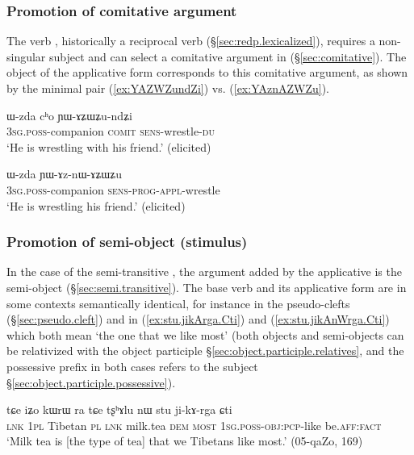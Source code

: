 \subsubsection{Promotion of comitative argument} \label{sec:applicative.comitative}
The verb , historically a reciprocal verb (§\ref{sec:redp.lexicalized}), requires a non-singular subject and can select a comitative argument in  (§\ref{sec:comitative}). The object of the applicative form  corresponds to this comitative argument, as shown by the minimal pair (\ref{ex:YAZWZundZi}) vs. (\ref{ex:YAznAZWZu}).

\begin{exe}
\ex \label{ex:YAZWZundZi}
\gll ɯ-zda cʰo ɲɯ-ɤʑɯʑu-ndʑi \\
\textsc{3sg}.\textsc{poss}-companion \textsc{comit} \textsc{sens}-wrestle-\textsc{du}  \\
\glt `He is wrestling with his friend.' (elicited)
\end{exe}

\begin{exe}
\ex \label{ex:YAznAZWZu}
\gll ɯ-zda ɲɯ-ɤz-nɯ-ɤʑɯʑu \\
\textsc{3sg}.\textsc{poss}-companion \textsc{sens}-\textsc{prog}-\textsc{appl}-wrestle \\
\glt `He is wrestling his friend.' (elicited)
\end{exe}

\subsubsection{Promotion of semi-object (stimulus)} \label{sec:applicative.semi.object}
In the case of the semi-transitive , the argument added by the applicative is the semi-object (§\ref{sec:semi.transitive}). The base verb  and its applicative form  are in some contexts semantically identical, for instance in the pseudo-clefts  (§\ref{sec:pseudo.cleft})  and  in (\ref{ex:stu.jikArga.Cti}) and (\ref{ex:stu.jikAnWrga.Cti}) which both mean `the one that we like most' (both objects and semi-objects can be relativized with the object participle §\ref{sec:object.participle.relatives}, and the possessive prefix in both cases refers to the subject §\ref{sec:object.participle.possessive}).


\begin{exe}
\ex \label{ex:stu.jikArga.Cti}
\gll tɕe iʑo kɯrɯ ra tɕe tʂʰɤlu nɯ stu ji-kɤ-rga ɕti \\
\textsc{lnk} \textsc{1pl} Tibetan \textsc{pl} \textsc{lnk} milk.tea \textsc{dem} \textsc{most} \textsc{1sg}.\textsc{poss}-\textsc{obj}:\textsc{pcp}-like be.\textsc{aff}:\textsc{fact} \\
\glt `Milk tea is [the type of tea] that we Tibetans like most.' (05-qaZo, 169)
\end{exe}

